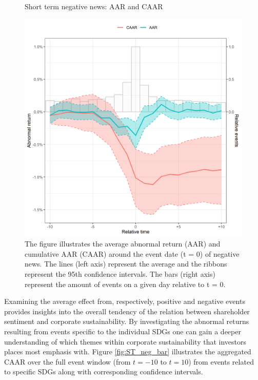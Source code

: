 \begin{figure} [H]
    \centering
    \caption{Short term negative news: AAR and CAAR}
    \includegraphics[scale=0.6]{Projekt/1.Figures analysis/ST_negative_all_CI.png}
     \caption*{\footnotesize The figure illustrates the average abnormal return (AAR) and cumulative AAR (CAAR) around the event date (t = 0) of negative news. The lines (left axis) represent the average and the ribbons represent the 95th confidence intervals. The bars (right axis) represent the amount of events on a given day relative to t = 0. }
    \label{fig:ST_neg_news}
\end{figure}

Examining the average effect from, respectively, positive and negative events provides insights into the overall tendency of the relation between shareholder sentiment and corporate sustainability. By investigating the abnormal returns resulting from events specific to the individual SDGs one can gain a deeper understanding of which themes within corporate sustainability that investors places most emphasis with. Figure \ref{fig:ST_neg_bar} illustrates the aggregated CAAR over the full event window (from $t=-10$ to $t=10$) from events related to specific SDGs along with corresponding confidence intervals.

